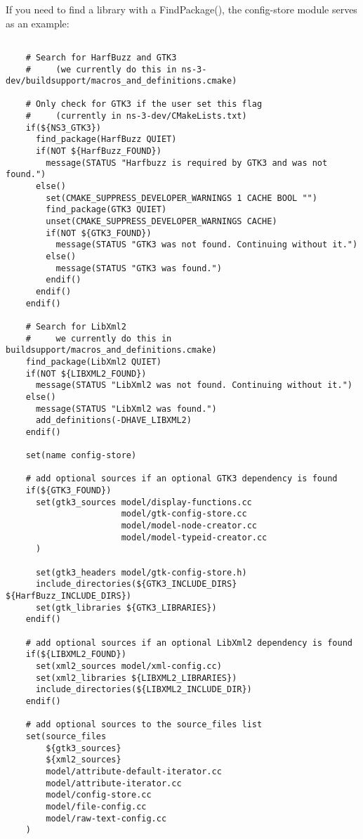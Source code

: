 \documentclass{article}
\begin{document}
    If you need to find a library with a FindPackage(), the config-store module serves as an example:
    \begin{verbatim}

    # Search for HarfBuzz and GTK3
    #     (we currently do this in ns-3-dev/buildsupport/macros_and_definitions.cmake)

    # Only check for GTK3 if the user set this flag
    #     (currently in ns-3-dev/CMakeLists.txt)
    if(${NS3_GTK3})
      find_package(HarfBuzz QUIET)
      if(NOT ${HarfBuzz_FOUND})
        message(STATUS "Harfbuzz is required by GTK3 and was not found.")
      else()
        set(CMAKE_SUPPRESS_DEVELOPER_WARNINGS 1 CACHE BOOL "")
        find_package(GTK3 QUIET)
        unset(CMAKE_SUPPRESS_DEVELOPER_WARNINGS CACHE)
        if(NOT ${GTK3_FOUND})
          message(STATUS "GTK3 was not found. Continuing without it.")
        else()
          message(STATUS "GTK3 was found.")
        endif()
      endif()
    endif()

    # Search for LibXml2
    #     we currently do this in buildsupport/macros_and_definitions.cmake)
    find_package(LibXml2 QUIET)
    if(NOT ${LIBXML2_FOUND})
      message(STATUS "LibXml2 was not found. Continuing without it.")
    else()
      message(STATUS "LibXml2 was found.")
      add_definitions(-DHAVE_LIBXML2)
    endif()

    set(name config-store)

    # add optional sources if an optional GTK3 dependency is found
    if(${GTK3_FOUND})
      set(gtk3_sources model/display-functions.cc
                       model/gtk-config-store.cc
                       model/model-node-creator.cc
                       model/model-typeid-creator.cc
      )

      set(gtk3_headers model/gtk-config-store.h)
      include_directories(${GTK3_INCLUDE_DIRS} ${HarfBuzz_INCLUDE_DIRS})
      set(gtk_libraries ${GTK3_LIBRARIES})
    endif()

    # add optional sources if an optional LibXml2 dependency is found
    if(${LIBXML2_FOUND})
      set(xml2_sources model/xml-config.cc)
      set(xml2_libraries ${LIBXML2_LIBRARIES})
      include_directories(${LIBXML2_INCLUDE_DIR})
    endif()

    # add optional sources to the source_files list
    set(source_files
        ${gtk3_sources}
        ${xml2_sources}
        model/attribute-default-iterator.cc
        model/attribute-iterator.cc
        model/config-store.cc
        model/file-config.cc
        model/raw-text-config.cc
    )


\end{verbatim}
\end{document}
